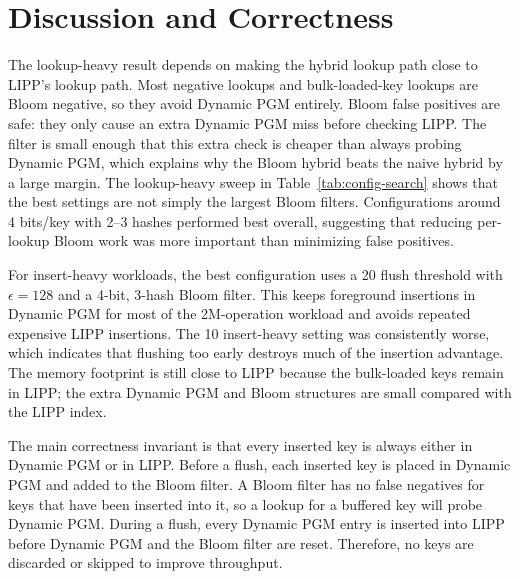 \documentclass{MITcsail}
\newcommand{\permil}{\textperthousand}
\begin{document}
\section{Discussion and Correctness}

The lookup-heavy result depends on making the hybrid lookup path close to LIPP's
lookup path. Most negative lookups and bulk-loaded-key lookups are Bloom
negative, so they avoid Dynamic PGM entirely. Bloom false positives are safe:
they only cause an extra Dynamic PGM miss before checking LIPP. The filter is
small enough that this extra check is cheaper than always probing Dynamic PGM,
which explains why the Bloom hybrid beats the naive hybrid by a large margin.
The lookup-heavy sweep in Table~\ref{tab:config-search} shows that the best
settings are not simply the largest Bloom filters. Configurations around
4 bits/key with 2--3 hashes performed best overall, suggesting that reducing
per-lookup Bloom work was more important than minimizing false positives.

For insert-heavy workloads, the best configuration uses a 20\permil{} flush
threshold with $\epsilon=128$ and a 4-bit, 3-hash Bloom filter. This keeps
foreground insertions in Dynamic PGM for most of the 2M-operation workload and
avoids repeated expensive LIPP insertions. The 10\permil{} insert-heavy setting
was consistently worse, which indicates that flushing too early destroys much of
the insertion advantage. The memory footprint is still close to LIPP because
the bulk-loaded keys remain in LIPP; the extra Dynamic PGM and Bloom structures
are small compared with the LIPP index.

The main correctness invariant is that every inserted key is always either in
Dynamic PGM or in LIPP. Before a flush, each inserted key is placed in Dynamic
PGM and added to the Bloom filter. A Bloom filter has no false negatives for
keys that have been inserted into it, so a lookup for a buffered key will probe
Dynamic PGM. During a flush, every Dynamic PGM entry is inserted into LIPP
before Dynamic PGM and the Bloom filter are reset. Therefore, no keys are
discarded or skipped to improve throughput.
\end{document}
